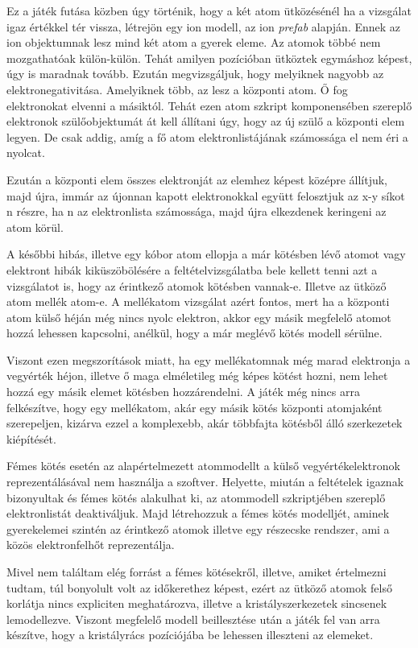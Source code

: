 \documentclass[colorlinks]{thesis-ekf}
\theoremstyle{definition}
\theoremstyle{remark}
\begin{document}
Ez a játék futása közben úgy történik, hogy a két atom ütközésénél ha a vizsgálat igaz értékkel tér vissza, létrejön egy ion modell, az ion \textit{prefab} alapján. Ennek az ion objektumnak lesz mind két atom a gyerek eleme. Az atomok többé nem mozgathatóak külön-külön. Tehát amilyen pozícióban ütköztek egymáshoz képest, úgy is maradnak tovább.  Ezután megvizsgáljuk, hogy melyiknek nagyobb az elektronegativitása. Amelyiknek több, az lesz a központi atom. Ő fog elektronokat elvenni a másiktól. Tehát ezen atom szkript komponensében szereplő elektronok szülőobjektumát át kell állítani úgy, hogy az új szülő a központi elem legyen. De csak addig, amíg a fő atom elektronlistájának számossága el nem éri a nyolcat.

Ezután a központi elem összes elektronját az elemhez képest középre állítjuk, majd újra, immár az újonnan kapott elektronokkal együtt felosztjuk az x-y síkot n részre, ha n az elektronlista számossága, majd újra elkezdenek keringeni az atom körül.

A későbbi hibás, illetve egy kóbor atom ellopja a már kötésben lévő atomot vagy elektront hibák kiküszöbölésére a feltételvizsgálatba bele kellett tenni azt a vizsgálatot is, hogy az érintkező atomok kötésben vannak-e. Illetve az ütköző atom mellék atom-e. A mellékatom vizsgálat azért fontos, mert ha a központi atom külső héján még nincs nyolc elektron, akkor egy másik megfelelő atomot hozzá lehessen kapcsolni, anélkül, hogy a már meglévő kötés modell sérülne.

Viszont ezen megszorítások miatt, ha egy mellékatomnak még marad elektronja a vegyérték héjon, illetve ő maga elméletileg még képes kötést hozni, nem lehet hozzá egy másik elemet kötésben hozzárendelni. A játék még nincs arra felkészítve, hogy egy mellékatom, akár egy másik kötés központi atomjaként szerepeljen, kizárva ezzel a komplexebb, akár többfajta kötésből álló szerkezetek kiépítését.

Fémes kötés esetén az alapértelmezett atommodellt a külső vegyértékelektronok reprezentálásával nem használja a szoftver. Helyette, miután a feltételek igaznak bizonyultak és fémes kötés alakulhat ki, az atommodell szkriptjében szereplő elektronlistát deaktiváljuk. Majd létrehozzuk a fémes kötés modelljét, aminek gyerekelemei szintén az érintkező atomok illetve egy részecske rendszer, ami a közös elektronfelhőt reprezentálja.

Mivel nem találtam elég forrást a fémes kötésekről, illetve, amiket értelmezni tudtam, túl bonyolult volt az időkerethez képest, ezért az ütköző atomok felső korlátja nincs expliciten meghatározva, illetve a kristályszerkezetek sincsenek lemodellezve. Viszont megfelelő modell beillesztése után a játék fel van arra készítve, hogy a kristályrács pozíciójába be lehessen illeszteni az elemeket.
\end{document}
